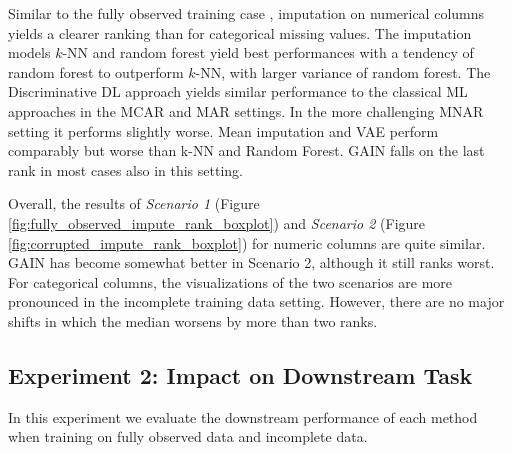 Similar to the fully observed training case , imputation on numerical columns yields a clearer ranking than for categorical missing values. The imputation models $k$-NN and random forest yield best performances with a tendency of random forest to outperform $k$-NN, with larger variance of random forest. The Discriminative DL approach yields similar performance to the classical ML approaches in the MCAR and MAR settings. In the more challenging MNAR setting it performs slightly worse. Mean imputation and VAE perform comparably but worse than k-NN and Random Forest. GAIN falls on the last rank in most cases also in this setting.

Overall, the results of \textit{Scenario 1} (Figure \ref{fig:fully_observed_impute_rank_boxplot}) and \textit{Scenario 2} (Figure \ref{fig:corrupted_impute_rank_boxplot}) for numeric columns are quite similar. GAIN has become somewhat better in Scenario 2, although it still ranks worst. For categorical columns, the visualizations of the two scenarios are more pronounced in the incomplete training data setting. However, there are no major shifts in which the median worsens by more than two ranks. 





\subsection{Experiment 2: Impact on Downstream Task}

In this experiment we evaluate the downstream performance of each method when training on fully observed data and incomplete data.

